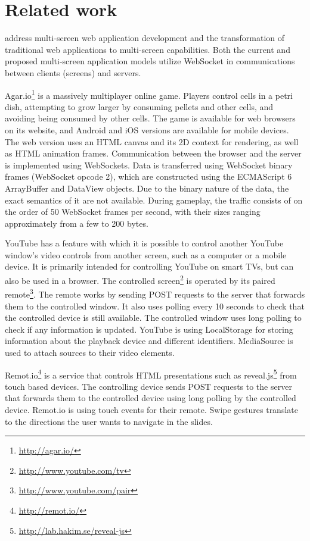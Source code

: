 \documentclass[a4paper,english,twocolumn,9pt]{extarticle}
\begin{document}
\section{Related work}

\citet{bassbouss} address multi-screen web application development and
the transformation of traditional web applications to multi-screen
capabilities. Both the current and proposed multi-screen application
models utilize WebSocket in communications between clients (screens)
and servers.

Agar.io\footnote{\url{http://agar.io/}} is a massively multiplayer
online game. Players control cells in a petri dish, attempting to grow
larger by consuming pellets and other cells, and avoiding being
consumed by other cells. The game is available for web browsers on its
website, and Android and iOS versions are available for mobile
devices. The web version uses an HTML canvas and its 2D context for
rendering, as well as HTML animation frames. Communication between the
browser and the server is implemented using WebSockets. Data is
transferred using WebSocket binary frames (WebSocket opcode 2), which
are constructed using the ECMAScript 6 ArrayBuffer and DataView
objects. Due to the binary nature of the data, the exact semantics of
it are not available. During gameplay, the traffic consists of on the
order of 50 WebSocket frames per second, with their sizes ranging
approximately from a few to 200 bytes.

YouTube has a feature with which it is possible to control another
YouTube window's video controls from another screen, such as a
computer or a mobile device. It is primarily intended for controlling
YouTube on smart TVs, but can also be used in a browser. The
controlled screen\footnote{\url{http://www.youtube.com/tv}} is
operated by its paired
remote\footnote{\url{http://www.youtube.com/pair}}. The remote works
by sending POST requests to the server that forwards them to the
controlled window. It also uses polling every 10 seconds to check that
the controlled device is still available. The controlled window uses
long polling to check if any information is updated. YouTube is using
LocalStorage for storing information about the playback device and
different identifiers. MediaSource is used to attach sources to their
video elements.

Remot.io\footnote{\url{http://remot.io/}} is a service that controls
HTML presentations such as
reveal.js\footnote{\url{http://lab.hakim.se/reveal-js}} from touch
based devices. The controlling device sends POST requests to the
server that forwards them to the controlled device using long polling
by the controlled device. Remot.io is using touch events for their
remote. Swipe gestures translate to the directions the user wants to
navigate in the slides.
\end{document}
